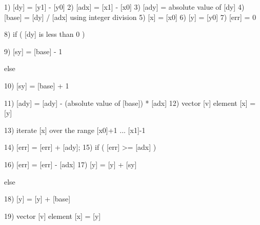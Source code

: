 \begin{programlisting}
  1)   [dy] = [y1] - [y0]
  2)  [adx] = [x1] - [x0]
  3)  [ady] = absolute value of [dy]
  4) [base] = [dy] / [adx] using integer division
  5)    [x] = [x0]
  6)    [y] = [y0]
  7)  [err] = 0

  8) if ( [dy] is less than 0 ) {
        9) [sy] = [base] - 1

     } else {
       10) [sy] = [base] + 1

     }

 11) [ady] = [ady] - (absolute value of [base]) * [adx]
 12) vector [v] element [x] = [y]

 13) iterate [x] over the range [x0]+1 ... [x1]-1 {
       14) [err] = [err] + [ady];
       15) if ( [err] >= [adx] ) {
             16) [err] = [err] - [adx]
             17)   [y] = [y] + [sy]

           } else {
             18) [y] = [y] + [base]

           }

       19) vector [v] element [x] = [y]

     }
\end{programlisting}








